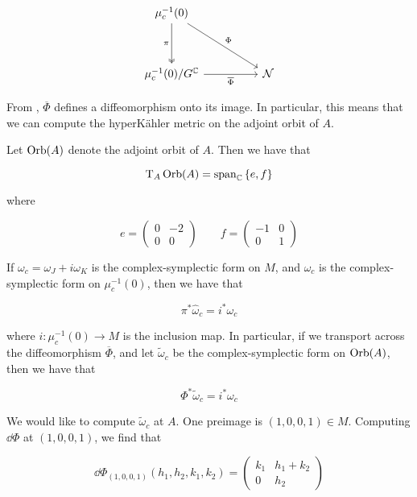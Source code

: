 \documentclass{article}
\begin{document}
\[\begin{tikzcd}[ampersand replacement=\&]
	{\mu_c^{-1}(0)} \\
	\\
	{\mu_c^{-1}(0)/G^\C} \&\& \mcN
	\arrow["\pi"', two heads, from=1-1, to=3-1]
	\arrow["\overline\Phi"', from=3-1, to=3-3]
	\arrow["\Phi", from=1-1, to=3-3]
\end{tikzcd}\]

From \cite[Theorem 2.7]{kobak_classical_1996}, \(\overline\Phi\) defines a diffeomorphism onto its image. In particular, this means that we can compute the hyperK\"ahler metric on the adjoint orbit of \(A\).

Let \(\operatorname{Orb}(A)\) denote the adjoint orbit of \(A\). Then we have that

\[\mathrm{T}_A\operatorname{Orb}(A) = \operatorname{span}_{\mathbb{C}}\left\{e, f\right\}\]

where

\[e = \begin{pmatrix}
    0 & -2 \\
    0 & 0
\end{pmatrix} \qquad f = \begin{pmatrix}
    -1 & 0 \\
    0 & 1
\end{pmatrix}\]

If \(\omega_c = \omega_J + i\omega_K\) is the complex-symplectic form on \(M\), and \(\hat\omega_c\) is the complex-symplectic form on \(\mu_c^{-1}(0)\), then we have that

\[\pi^*\hat\omega_c = i^*\omega_c\]

where \(i : \mu_c^{-1}(0) \to M\) is the inclusion map. In particular, if we transport across the diffeomorphism \(\overline\Phi\), and let \(\tilde \omega_c\) be the complex-symplectic form on \(\operatorname{Orb}(A)\), then we have that

\[\Phi^*\tilde\omega_c = i^*\omega_c\]

We would like to compute \(\tilde\omega_c\) at \(A\). One preimage is \((1, 0, 0, 1) \in M\). Computing \(\dd\Phi\) at \((1, 0, 0, 1)\), we find that

\[\dd\Phi_{(1, 0, 0, 1)}(h_1, h_2, k_1, k_2) = \begin{pmatrix}
    k_1 & h_1 + k_2 \\
    0 & h_2
\end{pmatrix}\]
\end{document}
